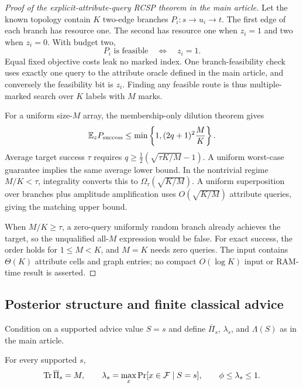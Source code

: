 \begin{proof}[Proof of the explicit-attribute-query RCSP theorem in the main article]
Let the known topology contain $K$ two-edge branches
$P_i:s\to u_i\to t$. The first edge of each branch has resource one. The
second has resource one when $z_i=1$ and two when $z_i=0$. With budget two,
\begin{equation}
  P_i\text{ is feasible}\quad\Longleftrightarrow\quad z_i=1.
\end{equation}
Equal fixed objective costs leak no marked index. One branch-feasibility check
uses exactly one query to the attribute oracle defined in the main article, and conversely the
feasibility bit is $z_i$. Finding any feasible route is thus multiple-marked
search over $K$ labels with $M$ marks.

For a uniform size-$M$ array, the membership-only dilution theorem gives
\begin{equation}
 \mathbb{E}_zP_{\mathrm{success}}\leq
 \min\left\{1,(2q+1)^2\frac{M}{K}\right\}.
\end{equation}
Average target success $\tau$ requires
$q\geq\tfrac12(\sqrt{\tau K/M}-1)$. A uniform worst-case guarantee implies
the same average lower bound. In the nontrivial regime $M/K<\tau$, integrality
converts this to $\Omega_\tau(\sqrt{K/M})$. A uniform superposition over
branches plus amplitude amplification uses $O(\sqrt{K/M})$ attribute queries,
giving the matching upper bound.

When $M/K\geq\tau$, a zero-query uniformly random branch already achieves the
target, so the unqualified all-$M$ expression would be false. For exact
success, the order holds for $1\leq M<K$, and $M=K$ needs zero queries. The
input contains $\Theta(K)$ attribute cells and graph entries; no compact
$O(\log K)$ input or RAM-time result is asserted.
\end{proof}

\subsection{Posterior structure and finite classical advice}

Condition on a supported advice value $S=s$ and define
$\overline\Pi_s$, $\lambda_s$, and $\Lambda(S)$ as in the main article.

\begin{lemma}
For every supported $s$,
\begin{equation}
 \operatorname{Tr}\overline\Pi_s=M,
 \qquad
 \lambda_s=\max_x\Pr[x\in\mathcal{F}\mid S=s],
 \qquad
 \phi\leq\lambda_s\leq1.
\end{equation}
\label{lem:posterior-projector}
\end{lemma}

